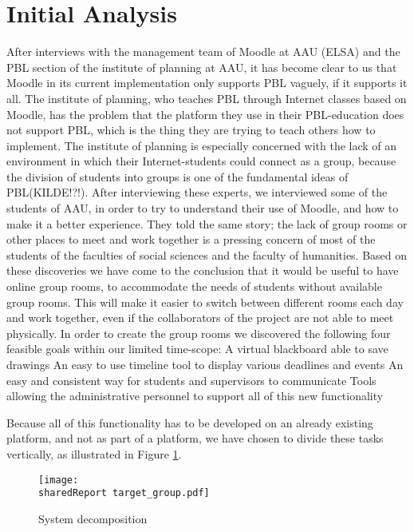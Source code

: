 \section{Initial Analysis}
\begin{comment}
In the preliminary phase of working with Electronic-learning (E-learning) it is important for us to ensure that we are in fact working with problems that are relevant in the E-learning and Problem Based Learning (PBL) fields of study, as we are aiming at improving the overall way that the chosen E-learning environment at Aalborg University (AAU), namely Moodle, supports PBL. Because AAU is renowned for its implementation of PBL, we do not have to look very far to find some of the leading experts in this field.
\end{comment}



After interviews with the management team of Moodle at AAU (ELSA) and the PBL section of the institute of planning at AAU, it has become clear to us that Moodle in its current implementation only supports PBL vaguely, if it supports it all. The institute of planning, who teaches PBL through Internet classes based on Moodle, has the problem that the platform they use in their PBL-education does not support PBL, which is the thing they are trying to teach others how to implement. The institute of planning is especially concerned with the lack of an environment in which their Internet-students could connect as a group, because the division of students into groups is one of the fundamental ideas of PBL(KILDE!?!). After interviewing these experts, we interviewed some of the students of AAU, in order to try to understand their use of Moodle, and how to make it a better experience. They told the same story; the lack of group rooms or other places to meet and work together is a pressing concern of most of the students of the faculties of social sciences and the faculty of humanities. Based on these discoveries we have come to the conclusion that it would be useful to have online group rooms, to accommodate the needs of students without available group rooms. This will make it easier to switch between different rooms each day and work together, even if the collaborators of the project are not able to meet physically.
In order to create the group rooms we discovered the following four feasible goals within our limited time-scope:
A virtual blackboard able to save drawings
An easy to use timeline tool to display various deadlines and events
An easy and consistent way for students and supervisors to communicate
Tools allowing the administrative personnel to support all of this new functionality

Because all of this functionality has to be developed on an already existing platform, and not as part of a platform, we have chosen to divide these tasks vertically, as illustrated in Figure \ref{fig:target_group}.


\begin{figure}
	\centering
		\texttt{[image: \\sharedReport target\_group.pdf]}
	\caption{System decomposition}
	\label{fig:target_group}
\end{figure}
